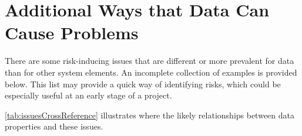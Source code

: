 %
%
\chapter{Additional Ways that Data Can Cause Problems}\label{bkm:additionalways}
\label{bkm:issues}
There are some risk-inducing issues that are different or more prevalent for data than for other system elements. An incomplete collection of examples is provided below. This list may provide a quick way of identifying risks, which could be especially useful at an early stage of a project. 

\autoref{tab:issuesCrossReference} illustrates where the likely relationships between data properties and these issues.

